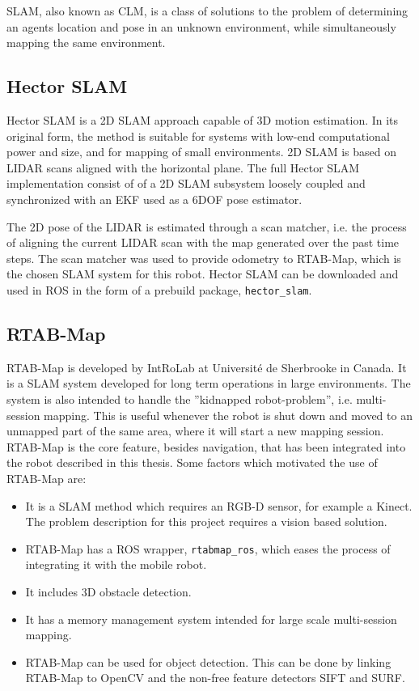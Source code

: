 \ac{SLAM}, also known as \ac{CLM}, is a class of solutions to the problem of determining an agents location and pose in an unknown environment, while simultaneously mapping the same environment.

\subsection{Hector SLAM}
\label{sec:hector}
Hector SLAM \cite{KohlbrecherMeyerStrykKlingaufFlexibleSlamSystem2011} is a 2D \ac{SLAM} approach capable of 3D motion estimation. In its original form, the method is suitable for systems with low-end computational power and size, and for mapping of small environments. 2D \ac{SLAM} is based on \ac{LIDAR} scans aligned with the horizontal plane. The full Hector SLAM implementation consist of of a 2D \ac{SLAM} subsystem loosely coupled and synchronized with an \ac{EKF} used as a  6DOF pose estimator. 

The 2D pose of the \ac{LIDAR} is estimated through a scan matcher, i.e. the process of aligning the current \ac{LIDAR} scan with the map generated over the past time steps. The scan matcher was used to provide odometry to \ac{RTAB-Map}, which is the chosen \ac{SLAM} system for this robot. Hector SLAM can be downloaded and used in \ac{ROS} in the form of a prebuild package, \texttt{hector\_slam}.  

\subsection{RTAB-Map}
\label{sec:RTAB-Map}

\ac{RTAB-Map} is developed by IntRoLab at Université de Sherbrooke in Canada. It is a \ac{SLAM} system developed for long term operations in large environments. The system is also intended to handle the ''kidnapped robot-problem'', i.e. multi-session mapping. This is useful whenever the robot is shut down and moved to an unmapped part of the same area, where it will start a new mapping session. \ac{RTAB-Map} is the core feature, besides navigation, that has been integrated into the robot described in this thesis. Some factors which motivated the use of \ac{RTAB-Map} are:

\begin{itemize}
	\item It is a \ac{SLAM} method which requires an RGB-D sensor, for example a Kinect. The problem description for this project requires a vision based solution.
	\item \ac{RTAB-Map} has a \ac{ROS} wrapper, \texttt{rtabmap\_ros}, which eases the process of integrating it with the mobile robot.
	\item It includes 3D obstacle detection.
	\item It has a memory management system intended for large scale multi-session mapping.
	\item \ac{RTAB-Map} can be used for object detection. This can be done by linking \ac{RTAB-Map} to OpenCV and the non-free feature detectors \ac{SIFT} and \ac{SURF}.
\end{itemize}

